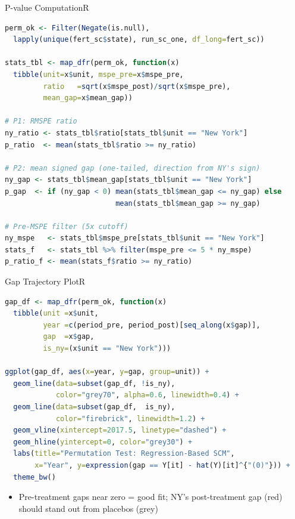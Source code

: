 \documentclass[hyperref={pdfpagelabels=false}]{beamer}
\begin{document}
\begin{frame}[fragile]{P-value Computation}{R}
\begin{lstlisting}[language=R, style=r-style]
perm_ok <- Filter(Negate(is.null),
  lapply(unique(fert_sc$state), run_sc_one, df_long=fert_sc))

stats_tbl <- map_dfr(perm_ok, function(x)
  tibble(unit=x$unit, mspe_pre=x$mspe_pre,
         ratio   =sqrt(x$mspe_post)/sqrt(x$mspe_pre),
         mean_gap=x$mean_gap))

# P1: RMSPE ratio
ny_ratio <- stats_tbl$ratio[stats_tbl$unit == "New York"]
p_ratio  <- mean(stats_tbl$ratio >= ny_ratio)

# P2: mean signed gap (one-tailed, direction from NY's sign)
ny_gap <- stats_tbl$mean_gap[stats_tbl$unit == "New York"]
p_gap  <- if (ny_gap < 0) mean(stats_tbl$mean_gap <= ny_gap) else
                          mean(stats_tbl$mean_gap >= ny_gap)

# Pre-MSPE filter (5x cutoff)
ny_mspe   <- stats_tbl$mspe_pre[stats_tbl$unit == "New York"]
stats_f   <- stats_tbl %>% filter(mspe_pre <= 5 * ny_mspe)
p_ratio_f <- mean(stats_f$ratio >= ny_ratio)
\end{lstlisting}
\end{frame}


\begin{frame}[fragile]{Gap Trajectory Plot}{R}
\begin{lstlisting}[language=R, style=r-style]
gap_df <- map_dfr(perm_ok, function(x)
  tibble(unit =x$unit,
         year =c(period_pre, period_post)[seq_along(x$gap)],
         gap  =x$gap,
         is_ny=(x$unit == "New York")))

ggplot(gap_df, aes(x=year, y=gap, group=unit)) +
  geom_line(data=subset(gap_df, !is_ny),
            color="grey70", alpha=0.6, linewidth=0.4) +
  geom_line(data=subset(gap_df,  is_ny),
            color="firebrick", linewidth=1.2) +
  geom_vline(xintercept=2017.5, linetype="dashed") +
  geom_hline(yintercept=0, color="grey30") +
  labs(title="Permutation Test: Regression-Based SCM",
       x="Year", y=expression(gap == Y[it] - hat(Y)[it]^{"(0)"})) +
  theme_bw()
\end{lstlisting}
\begin{itemize}
    \vspace{0.1cm}
    \item Pre-treatment gaps near zero = good fit;
    NY's post-treatment gap (red) should stand out from placebos (grey)
\end{itemize}
\end{frame}
\end{document}

